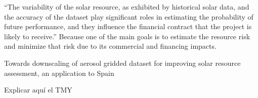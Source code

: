 
``The variability of the solar resource, as exhibited by historical solar data, and the accuracy of the dataset play significant roles in estimating the probability of future performance, and they influence the financial contract that the project is likely to receive.'' Because  one of the main goals is to estimate the resource risk and minimize that risk due to its commercial and financing impacts.



{\color{blue}Towards downscaling of aerosol gridded dataset for improving solar resource assessment, an application to Spain}


{\color{red} Explicar aquí el TMY}

